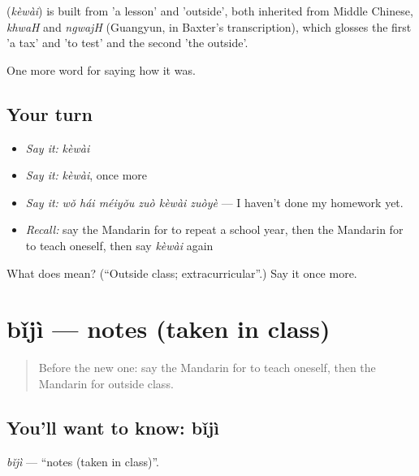 \begin{cousinweb}
\textbf{} (\emph{kèwài}) is built from  'a lesson' and  'outside', both inherited from Middle Chinese, \emph{khwaH} and \emph{ngwajH} (Guangyun, in Baxter's transcription), which glosses the first 'a tax' and 'to test' and the second 'the outside'.
\end{cousinweb}

\begin{grammarlens}[title={What you've built}]
One more word for saying how it was.
\end{grammarlens}

\subsection*{Your turn}
\begin{itemize}
\raggedright
  \item \emph{Say it:} \emph{kèwài}
  \item \emph{Say it:} \emph{kèwài}, once more
  \item \emph{Say it:} \emph{wǒ hái méiyǒu zuò kèwài zuòyè} — I haven't done my homework yet.
  \item \emph{Recall:} say the Mandarin for to repeat a school year, then the Mandarin for to teach oneself, then say \emph{kèwài} again
\end{itemize}

\begin{tcolorbox}[breakable,colback=teal!4,colframe=teal!35!black,title={Before you move on}]
What does  mean? (\textquotedblleft{}Outside class; extracurricular\textquotedblright{}.) Say it once more.
\end{tcolorbox}
\section[bǐjì]{bǐjì — notes (taken in class)}

\label{lesson:ZH-C497-biji}



\begin{quote}
Before the new one: say the Mandarin for to teach oneself, then the Mandarin for outside class.
\end{quote}

\subsection*{You'll want to know: bǐjì}
\emph{bǐjì} — \textquotedblleft{}notes (taken in class)\textquotedblright{}.

